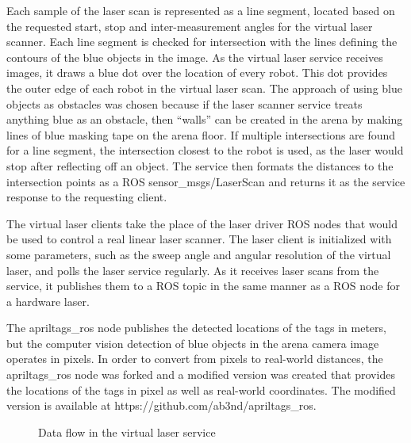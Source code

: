 Each sample of the laser scan is represented as a line segment, located based on the requested start, stop and inter-measurement angles for the virtual laser scanner. 
Each line segment is checked for intersection with the lines defining the contours of the blue objects in the image. 
As the virtual laser service receives images, it draws a blue dot over the location of every robot. 
This dot provides the outer edge of each robot in the virtual laser scan. 
The approach of using blue objects as obstacles was chosen because if the laser scanner service treats anything blue as an obstacle, then ``walls'' can be created in the arena by making lines of blue masking tape on the arena floor. 
If multiple intersections are found for a line segment, the intersection closest to the robot is used, as the laser would stop after reflecting off an object.
The service then formats the distances to the intersection points as a ROS sensor\_msgs/LaserScan and returns it as the service response to the requesting client. 

The virtual laser clients take the place of the laser driver ROS nodes that would be used to control a real linear laser scanner. 
The laser client is initialized with some parameters, such as the sweep angle and angular resolution of the virtual laser, and polls the laser service regularly. 
As it receives laser scans from the service, it publishes them to a ROS topic in the same manner as a ROS node for a hardware laser. 

The apriltags\_ros node publishes the detected locations of the tags in meters, but the computer vision detection of blue objects in the arena camera image operates in pixels. 
In order to convert from pixels to real-world distances, the apriltags\_ros node was forked and a modified version was created that provides the locations of the tags in pixel as well as real-world coordinates. 
The modified version is available at https://github.com/ab3nd/apriltags\_ros.

\begin{figure}
 	\centering
	\caption{Data flow in the virtual laser service}
\end{figure}

